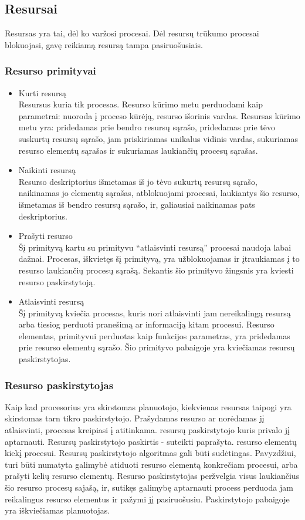 \subsection{Resursai}
Resursas yra tai, dėl ko varžosi procesai. Dėl resursų trūkumo procesai blokuojasi, gavę reikiamą resursą tampa pasiruošusiais. 

\subsubsection{Resurso primityvai}
	\begin{itemize}
		\item Kurti resursą \\ Resursus kuria tik procesas. Resurso kūrimo metu perduodami kaip parametrai: nuoroda į proceso kūrėją, resurso išorinis vardas. Resursas kūrimo metu yra: pridedamas prie bendro resursų sąrašo, pridedamas prie tėvo suskurtų resursų sąrašo, jam priskiriamas unikalus vidinis vardas, sukuriamas resurso elementų sąrašas ir sukuriamas laukiančių procesų sąrašas.
		\item Naikinti resursą \\ Resurso deskriptorius išmetamas iš jo tėvo sukurtų resursų sąrašo, naikinamas jo elementų sąrašas, atblokuojami procesai, laukiantys šio resurso, išmetamas iš bendro resursų sąrašo, ir, galiausiai naikinamas pats deskriptorius. 
		\item Prašyti resurso \\Šį primityvą kartu su primityvu “atlaisvinti resursą” procesai naudoja labai dažnai. Procesas, iškvietęs šį primityvą, yra užblokuojamas ir įtraukiamas į to resurso laukiančių procesų sąrašą. Sekantis šio primityvo žingsnis yra kviesti resurso paskirstytoją.
		\item Atlaisvinti resursą \\Šį primityvą kviečia procesas, kuris nori atlaisvinti jam nereikalingą resursą arba tiesiog perduoti pranešimą ar informaciją kitam procesui. Resurso elementas, primityvui perduotas kaip funkcijos parametras, yra pridedamas prie resurso elementų sąrašo. Šio primityvo pabaigoje yra kviečiamas resursų paskirstytojas.
	\end{itemize}

\subsubsection{Resurso paskirstytojas}
Kaip kad procesorius yra skirstomas planuotojo, kiekvienas resursas taipogi yra skirstomas tarn tikro paskirstytojo. Prašydamas resurso ar norėdamas jį atlaisvinti, procesas kreipiasi į atitinkama. resursų paskirstytojo kuris privalo jį aptarnauti.
Resursų paskirstytojo paskirtis - suteikti paprašyta. resurso elementų kiekį procesui. Resursų paskirstytojo algoritmas gali būti sudėtingas. Pavyzdžiui, turi būti numatyta galimybė atiduoti resurso elementą konkrečiam procesui, arba prašyti kelių resurso elementų. Resurso paskirstytojas peržvelgia visus laukiančius šio resurso procesų sajašą, ir, sutikęs galimybę aptarnauti process perduoda jam reikalingus resurso elementus ir pažymi jį pasiruošusiu. Paskirstytojo pabaigoje yra iškviečiamas planuotojas.



